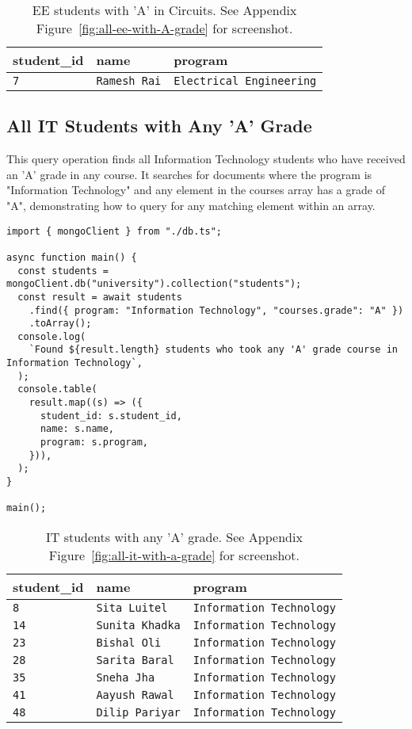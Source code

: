 \begin{table}[H]
  \centering
  \begin{tabular}{|l|l|l|}
    \hline
    \textbf{student\_id} & \textbf{name} & \textbf{program} \\
    \hline
    \texttt{7} & \texttt{Ramesh Rai} & \texttt{Electrical Engineering} \\
    \hline
  \end{tabular}
  \caption{EE students with 'A' in Circuits. See Appendix Figure~\ref{fig:all-ee-with-A-grade} for screenshot.}
\end{table}

\subsection{All IT Students with Any 'A' Grade}
This query operation finds all Information Technology students who have received an 'A' grade in any course. It searches for documents where the program is "Information Technology" and any element in the courses array has a grade of "A", demonstrating how to query for any matching element within an array.

\begin{verbatim}
import { mongoClient } from "./db.ts";

async function main() {
  const students = mongoClient.db("university").collection("students");
  const result = await students
    .find({ program: "Information Technology", "courses.grade": "A" })
    .toArray();
  console.log(
    `Found ${result.length} students who took any 'A' grade course in Information Technology`,
  );
  console.table(
    result.map((s) => ({
      student_id: s.student_id,
      name: s.name,
      program: s.program,
    })),
  );
}

main();
\end{verbatim}

\begin{table}[H]
  \centering
  \begin{tabular}{|l|l|l|}
    \hline
    \textbf{student\_id} & \textbf{name} & \textbf{program} \\
    \hline
    \texttt{8} & \texttt{Sita Luitel} & \texttt{Information Technology} \\
    \texttt{14} & \texttt{Sunita Khadka} & \texttt{Information Technology} \\
    \texttt{23} & \texttt{Bishal Oli} & \texttt{Information Technology} \\
    \texttt{28} & \texttt{Sarita Baral} & \texttt{Information Technology} \\
    \texttt{35} & \texttt{Sneha Jha} & \texttt{Information Technology} \\
    \texttt{41} & \texttt{Aayush Rawal} & \texttt{Information Technology} \\
    \texttt{48} & \texttt{Dilip Pariyar} & \texttt{Information Technology} \\
    \hline
  \end{tabular}
  \caption{IT students with any 'A' grade. See Appendix Figure~\ref{fig:all-it-with-a-grade} for screenshot.}
\end{table}

